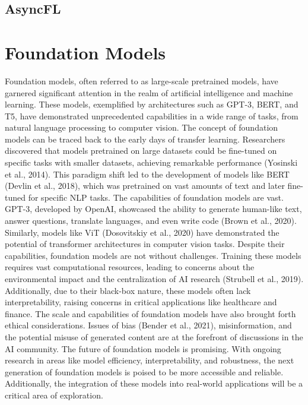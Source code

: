 \documentclass[withindex,glossary,firstyr]{cam-thesis}
\begin{document}
\subsection{AsyncFL}


 
\section{Foundation Models}

Foundation models, often referred to as large-scale pretrained models, have garnered significant attention in the realm of artificial intelligence and machine learning. These models, exemplified by architectures such as GPT-3, BERT, and T5, have demonstrated unprecedented capabilities in a wide range of tasks, from natural language processing to computer vision.
The concept of foundation models can be traced back to the early days of transfer learning. Researchers discovered that models pretrained on large datasets could be fine-tuned on specific tasks with smaller datasets, achieving remarkable performance (Yosinski et al., 2014). This paradigm shift led to the development of models like BERT (Devlin et al., 2018), which was pretrained on vast amounts of text and later fine-tuned for specific NLP tasks.
The capabilities of foundation models are vast. GPT-3, developed by OpenAI, showcased the ability to generate human-like text, answer questions, translate languages, and even write code (Brown et al., 2020). Similarly, models like ViT (Dosovitskiy et al., 2020) have demonstrated the potential of transformer architectures in computer vision tasks.
Despite their capabilities, foundation models are not without challenges. Training these models requires vast computational resources, leading to concerns about the environmental impact and the centralization of AI research (Strubell et al., 2019). Additionally, due to their black-box nature, these models often lack interpretability, raising concerns in critical applications like healthcare and finance.
The scale and capabilities of foundation models have also brought forth ethical considerations. Issues of bias (Bender et al., 2021), misinformation, and the potential misuse of generated content are at the forefront of discussions in the AI community.
The future of foundation models is promising. With ongoing research in areas like model efficiency, interpretability, and robustness, the next generation of foundation models is poised to be more accessible and reliable. Additionally, the integration of these models into real-world applications will be a critical area of exploration.
\end{document}
